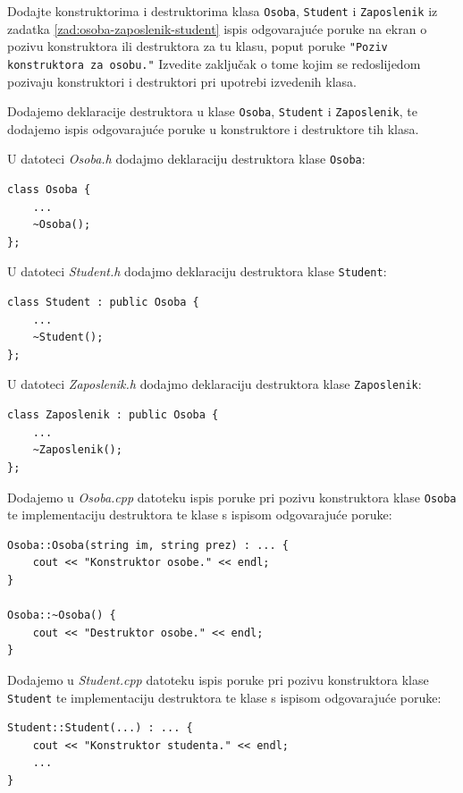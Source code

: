 \begin{zadatak}
    Dodajte konstruktorima i destruktorima klasa \texttt{Osoba},
    \texttt{Student} i \texttt{Zaposlenik} iz zadatka \ref{zad:osoba-zaposlenik-student}
    ispis odgovarajuće poruke na ekran
    o pozivu konstruktora ili destruktora za tu klasu, poput
    poruke \texttt{"Poziv konstruktora za osobu."}
    Izvedite zaključak o tome kojim se redoslijedom pozivaju konstruktori i destruktori pri upotrebi izvedenih klasa.
\end{zadatak}

\begin{rjesenje}
    Dodajemo deklaracije destruktora u klase \texttt{Osoba}, \texttt{Student} i \texttt{Zaposlenik},
    te dodajemo ispis odgovarajuće poruke u konstruktore
    i destruktore tih klasa.
    \medskip
    
    U datoteci \textit{Osoba.h} dodajmo deklaraciju destruktora klase \texttt{Osoba}:
    \begin{verbatim}
class Osoba {
    ...
    ~Osoba();
};
    \end{verbatim}
    U datoteci \textit{Student.h} dodajmo deklaraciju destruktora klase \texttt{Student}:
    \begin{verbatim}
class Student : public Osoba {
    ...
    ~Student();
};
    \end{verbatim}
    U datoteci \textit{Zaposlenik.h} dodajmo deklaraciju destruktora klase \texttt{Zaposlenik}:
    \begin{verbatim}
class Zaposlenik : public Osoba {
    ...
    ~Zaposlenik();
};
    \end{verbatim}
    Dodajemo u \textit{Osoba.cpp} datoteku ispis poruke pri pozivu konstruktora klase \texttt{Osoba}
    te implementaciju destruktora te klase s ispisom odgovarajuće poruke:
    \begin{verbatim}
Osoba::Osoba(string im, string prez) : ... {
    cout << "Konstruktor osobe." << endl;
}

Osoba::~Osoba() {
    cout << "Destruktor osobe." << endl;
}
    \end{verbatim}
    Dodajemo u \textit{Student.cpp} datoteku ispis poruke pri pozivu konstruktora klase \texttt{Student}
    te implementaciju destruktora te klase s ispisom odgovarajuće poruke:
    \begin{verbatim}
Student::Student(...) : ... {
    cout << "Konstruktor studenta." << endl;
    ...
}


\end{verbatim}
\end{rjesenje}
